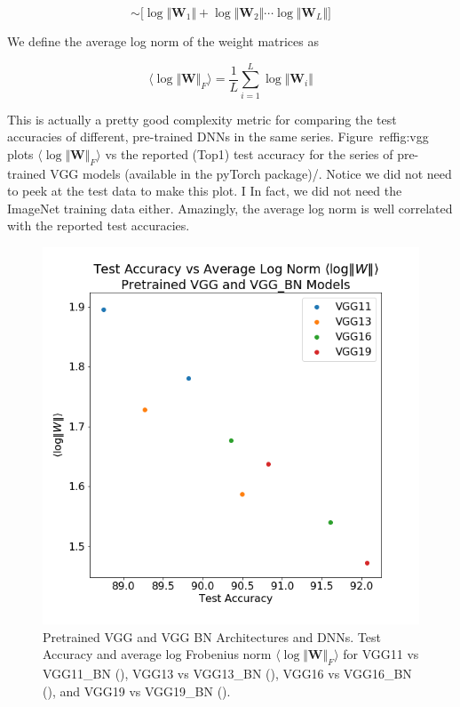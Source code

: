 $$\sim\bigg[\log\Vert\mathbf{W}_{1}\Vert+\log\Vert\mathbf{W}_{2}\Vert\cdots\log\Vert\mathbf{W}_{L}\Vert\bigg]$$

We define the average log norm of the weight matrices as

$$\langle\log\Vert\mathbf{W}\Vert_{F}\rangle=\dfrac{1}{L}\sum_{i=1}^{L}\log\Vert\mathbf{W}_{i}\Vert$$

This is actually a pretty good complexity metric for comparing the test accuracies of different, pre-trained DNNs in the same series.
Figure~ref{fig:vgg} plots $\langle\log\Vert\mathbf{W}\Vert_{F}\rangle$ vs the reported (Top1) test accuracy for the series of pre-trained
VGG models (available in the pyTorch package\cite{pyTorch})/.  Notice we did not need to peek at the test data to make this plot.  I
In fact, we did not need the ImageNet training data either.  Amazingly, the average log norm is well correlated with the reported test accuracies.

\begin{figure}[!htb]
 \centering
   \includegraphics[scale=0.40]{img/vgg-lognorms.png}
   \caption{
Pretrained VGG and VGG BN Architectures and DNNs.  Test Accuracy and average log Frobenius norm $\langle\log\Vert\mathbf{W}\Vert_{F}\rangle$ for
 VGG11 vs VGG11\_BN ({\color{blue}{blue}}),
VGG13 vs VGG13\_BN ({\color{orange}{orange}}),
VGG16 vs VGG16\_BN ({\color{green}{green}}),  and
VGG19 vs VGG19\_BN ({\color{red}{red}}). 
}
  \label{fig:vgg}
\end{figure}

